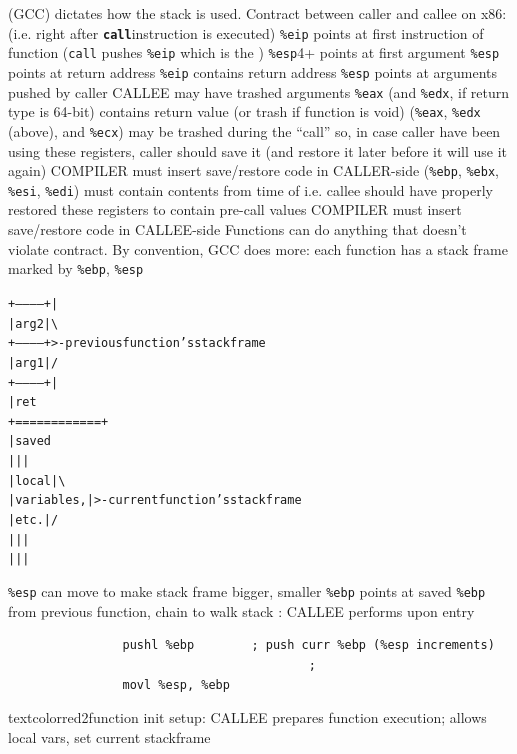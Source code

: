 \documentclass{note}
\begin{document}
\w \textcolor{red2}{} (GCC) dictates how the stack is
used. Contract between caller and callee on x86:
  \bit
  \w {} (i.e. right after
  \textcolor{red2}{\textbf{\texttt{call}}}instruction is executed)
     \bit
     \w \verb+%eip+ points at first instruction of function  ({\tt{}call}
              pushes \verb+%eip+ which is the )
     \w \verb+%esp+4+ points at first argument
     \w \verb+%esp+ points at return address 
     \eit
  \w {}
     \bit
     \w \verb+%eip+ contains return address
     \w \verb+%esp+ points at arguments pushed by caller
     \w CALLEE may have trashed arguments
     \w \verb+%eax+ (and \verb+%edx+, if return type is 64-bit) contains
              return value (or trash if function is void) 
     \w {} (\verb+%eax+, \verb+%edx+ (above), and
                                \verb+%ecx+) may be trashed during the
                                ``call'' 
       \bit
       \w so, in case caller have been using these registers, caller should save
          it (and restore it later before it will use it again)
       \w COMPILER must insert save/restore code in CALLER-side
       \eit
     \w {} (\verb+%ebp+, \verb+%ebx+, \verb+%esi+, \verb+%edi+) must contain contents
     from time of  
        \bit
        \w i.e. callee should have properly restored these registers to contain
        pre-call values
       \w COMPILER must insert save/restore code in CALLEE-side
        \eit
     \eit
  \eit
\w Functions can do anything that doesn't violate contract. By convention, GCC
does more: 
  \bit
  \w each function has a stack frame marked by \verb+%ebp+, \verb+%esp+
\begin{alltt}
		       +------------+   |
		       | arg 2      |   \textbackslash
		       +------------+    >- previous function's stack frame
		       | arg 1      |   /
		       +------------+   |
		       | ret %
		       \textcolor{red2}{+============+}
		       | saved %
		       |            |   |
		       |   local    |   \textbackslash
		       | variables, |    >- current function's stack frame
		       |    etc.    |   /
		       |            |   |
		       |            |   |
   \end{alltt}
    \w \verb+%esp+ can move to make stack frame bigger, smaller
    \w \verb+%ebp+ points at saved \verb+%ebp+ from previous function, chain
             to walk stack 
    \w \textcolor{red2}{}: CALLEE performs upon entry
     \begin{verbatim}
    			pushl %ebp        ; push curr %ebp (%esp increments)
                                          ; 
    			movl %esp, %ebp
     \end{verbatim}
     \w textcolor{red2}{\bb{}function init setup}: CALLEE prepares function
       execution; allows local vars, set current stackframe
    		
\end{document}
